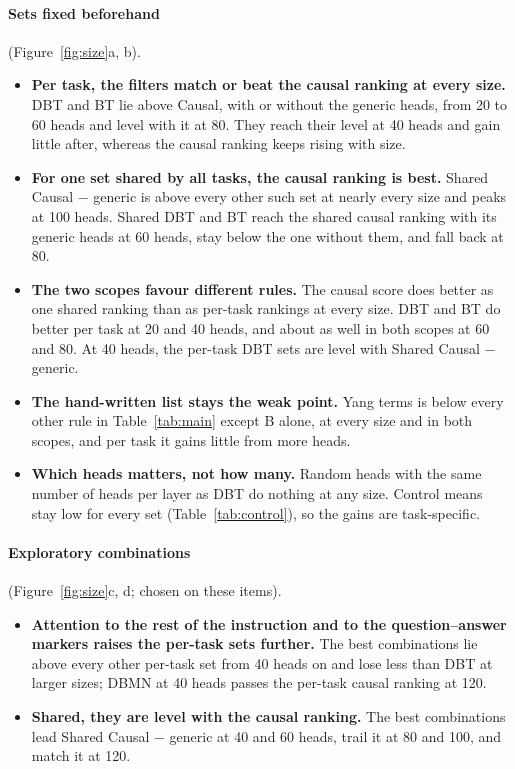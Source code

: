 \documentclass[10pt,a4paper]{article}
\begin{document}
\paragraph{Sets fixed beforehand} (Figure~\ref{fig:size}a, b).
\begin{itemize}
\item \textbf{Per task, the filters match or beat the causal ranking at every size.} DBT and BT lie above Causal, with or without the generic heads, from 20 to 60 heads and level with it at 80. They reach their level at 40 heads and gain little after, whereas the causal ranking keeps rising with size.
\item \textbf{For one set shared by all tasks, the causal ranking is best.} Shared Causal $-$ generic is above every other such set at nearly every size and peaks at 100 heads. Shared DBT and BT reach the shared causal ranking with its generic heads at 60 heads, stay below the one without them, and fall back at 80.
\item \textbf{The two scopes favour different rules.} The causal score does better as one shared ranking than as per-task rankings at every size. DBT and BT do better per task at 20 and 40 heads, and about as well in both scopes at 60 and 80. At 40 heads, the per-task DBT sets are level with Shared Causal $-$ generic.
\item \textbf{The hand-written list stays the weak point.} Yang terms is below every other rule in Table~\ref{tab:main} except B alone, at every size and in both scopes, and per task it gains little from more heads.
\item \textbf{Which heads matters, not how many.} Random heads with the same number of heads per layer as DBT do nothing at any size. Control means stay low for every set (Table~\ref{tab:control}), so the gains are task-specific.
\end{itemize}

\paragraph{Exploratory combinations} (Figure~\ref{fig:size}c, d; chosen on these items).
\begin{itemize}
\item \textbf{Attention to the rest of the instruction and to the question--answer markers raises the per-task sets further.} The best combinations lie above every other per-task set from 40 heads on and lose less than DBT at larger sizes; DBMN at 40 heads passes the per-task causal ranking at 120.
\item \textbf{Shared, they are level with the causal ranking.} The best combinations lead Shared Causal $-$ generic at 40 and 60 heads, trail it at 80 and 100, and match it at 120.
\end{itemize}
\end{document}
